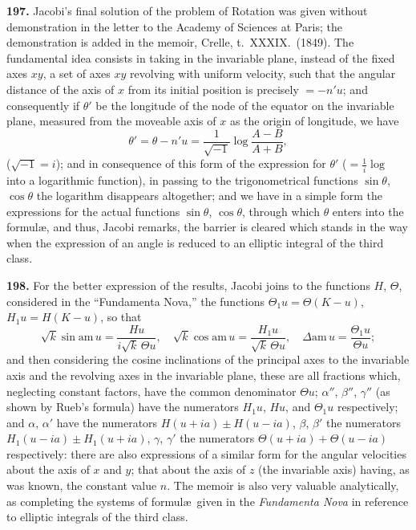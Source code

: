\documentclass[11pt,a4paper]{article}
\theoremstyle{definition}
\begin{document}
\textbf{197.} Jacobi's final solution of the problem of Rotation was given without demonstration in the letter to the Academy of Sciences at Paris; the demonstration is added in the memoir, Crelle, t.~XXXIX.~(1849). The fundamental idea consists in taking in the invariable plane, instead of the fixed axes $xy$, a set of axes $xy$ revolving with uniform velocity, such that the angular distance of the axis of $x$ from its initial position is precisely $= -n'u$; and consequently if $\theta'$ be the longitude of the node of the equator on the invariable plane, measured from the moveable axis of $x$ as the origin of longitude, we have
\[
\theta' = \theta - n'u = \frac{1}{\sqrt{-1}}\log\frac{A - B}{A + B},
\]
($\sqrt{-1} = i$); and in consequence of this form of the expression for $\theta'$ ($= \frac{1}{i}\log$ into a logarithmic function), in passing to the trigonometrical functions $\sin\theta$, $\cos\theta$ the logarithm disappears altogether; and we have in a simple form the expressions for the actual functions $\sin\theta$, $\cos\theta$, through which $\theta$ enters into the formul\ae, and thus, Jacobi remarks, the barrier is cleared which stands in the way when the expression of an angle is reduced to an elliptic integral of the third class.

\textbf{198.} For the better expression of the results, Jacobi joins to the functions $H$, $\Theta$, considered in the ``Fundamenta Nova,'' the functions $\Theta_1 u = \Theta(K - u)$, $H_1 u = H(K - u)$, so that
\[
\sqrt{k}\sin\text{am}\,u = \frac{Hu}{i\sqrt{k}\,\Theta u}, \quad \sqrt{k}\cos\text{am}\,u = \frac{H_1 u}{\sqrt{k}\,\Theta u}, \quad \Delta\text{am}\,u = \frac{\Theta_1 u}{\Theta u};
\]
and then considering the cosine inclinations of the principal axes to the invariable axis and the revolving axes in the invariable plane, these are all fractions which, neglecting constant factors, have the common denominator $\Theta u$; $\alpha''$, $\beta''$, $\gamma''$ (as shown by Rueb's formula) have the numerators $H_1 u$, $Hu$, and $\Theta_1 u$ respectively; and $\alpha$, $\alpha'$ have the numerators $H(u + ia) \pm H(u - ia)$, $\beta$, $\beta'$ the numerators $H_1(u - ia) \pm H_1(u + ia)$, $\gamma$, $\gamma'$ the numerators $\Theta(u + ia) + \Theta(u - ia)$ respectively: there are also expressions of a similar form for the angular velocities about the axis of $x$ and $y$; that about the axis of $z$ (the invariable axis) having, as was known, the constant value $n$. The memoir is also very valuable analytically, as completing the systems of formul\ae\ given in the \textit{Fundamenta Nova} in reference to elliptic integrals of the third class.
\end{document}
